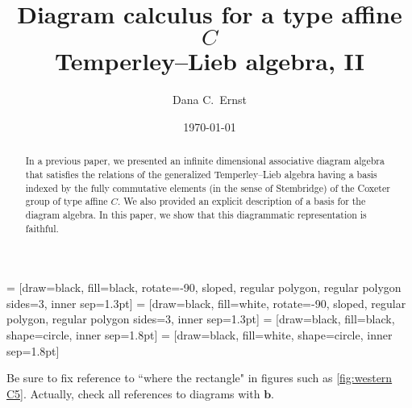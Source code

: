\documentclass[11pt]{amsart}
\date{\today}
\theoremstyle{definition}
\numberwithin{equation}{section}
\renewcommand{\(}{\left(}
\renewcommand{\)}{\right)}
\begin{document}
 = [draw=black, fill=black, rotate=-90, sloped, regular polygon, regular polygon sides=3, inner sep=1.3pt]
 = [draw=black, fill=white, rotate=-90, sloped, regular polygon, regular polygon sides=3, inner sep=1.3pt]
 = [draw=black, fill=black, shape=circle, inner sep=1.8pt]
 = [draw=black, fill=white, shape=circle, inner sep=1.8pt]

\title[Diagram calculus for a type affine $C$ Temperley--Lieb algebra, II]{Diagram calculus for a type affine $C$ \\ Temperley--Lieb algebra, II}

\author[D.C.~Ernst]{Dana C.~Ernst}
\address{Department of Mathematics and Statistics, Northern Arizona University, Flagstaff, AZ 86011}



\begin{abstract}
In a previous paper, we presented an infinite dimensional associative diagram algebra that satisfies the relations of the generalized Temperley--Lieb algebra having a basis indexed by the fully commutative elements (in the sense of Stembridge) of the Coxeter group of type affine $C$.  We also provided an explicit description of a basis for the diagram algebra.  In this paper, we show that this diagrammatic representation is faithful.
\end{abstract}

\maketitle

{\color{red}Be sure to fix reference to ``where the rectangle" in figures such as \ref{fig:western C5}. Actually, check all references to diagrams with $\mathbf{b}$.}

\end{document}
